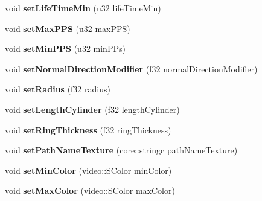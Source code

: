 \begin{DoxyCompactItemize}
\item 
\hypertarget{class_particle_model_a3d94a2ab52b078b67d37b14cd2213bdf}{void {\bfseries set\-Life\-Time\-Min} (u32 life\-Time\-Min)}\label{class_particle_model_a3d94a2ab52b078b67d37b14cd2213bdf}

\item 
\hypertarget{class_particle_model_aa6ab281bda3309140247f0774d59f3f6}{void {\bfseries set\-Max\-P\-P\-S} (u32 max\-P\-P\-S)}\label{class_particle_model_aa6ab281bda3309140247f0774d59f3f6}

\item 
\hypertarget{class_particle_model_a3d67b143881897ea4df87f566bc26edc}{void {\bfseries set\-Min\-P\-P\-S} (u32 min\-P\-Ps)}\label{class_particle_model_a3d67b143881897ea4df87f566bc26edc}

\item 
\hypertarget{class_particle_model_abdb963e9e65cf735163c1c42622b4905}{void {\bfseries set\-Normal\-Direction\-Modifier} (f32 normal\-Direction\-Modifier)}\label{class_particle_model_abdb963e9e65cf735163c1c42622b4905}

\item 
\hypertarget{class_particle_model_a8a8b80fd5978788cb6b2cd8c0c625855}{void {\bfseries set\-Radius} (f32 radius)}\label{class_particle_model_a8a8b80fd5978788cb6b2cd8c0c625855}

\item 
\hypertarget{class_particle_model_aa9f354658c7b81ffe378a88bf42ad6fd}{void {\bfseries set\-Length\-Cylinder} (f32 length\-Cylinder)}\label{class_particle_model_aa9f354658c7b81ffe378a88bf42ad6fd}

\item 
\hypertarget{class_particle_model_adad7df1e4ec075ffb86d32ffea4b199f}{void {\bfseries set\-Ring\-Thickness} (f32 ring\-Thickness)}\label{class_particle_model_adad7df1e4ec075ffb86d32ffea4b199f}

\item 
\hypertarget{class_particle_model_ac44eeca675b5bd7b72974eec8386968d}{void {\bfseries set\-Path\-Name\-Texture} (core\-::stringc path\-Name\-Texture)}\label{class_particle_model_ac44eeca675b5bd7b72974eec8386968d}

\item 
\hypertarget{class_particle_model_adfe0b83b4c25c4e613e051422bdd1349}{void {\bfseries set\-Min\-Color} (video\-::\-S\-Color min\-Color)}\label{class_particle_model_adfe0b83b4c25c4e613e051422bdd1349}

\item 
\hypertarget{class_particle_model_a4410a41c677b700eb9358916414e3293}{void {\bfseries set\-Max\-Color} (video\-::\-S\-Color max\-Color)}\label{class_particle_model_a4410a41c677b700eb9358916414e3293}


\end{DoxyCompactItemize}
